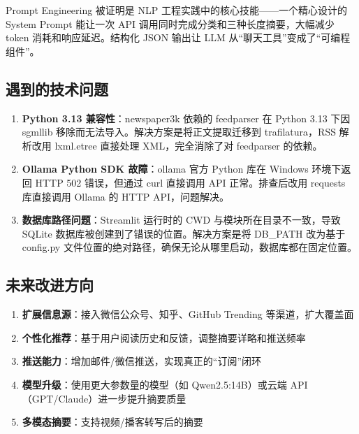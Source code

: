\documentclass[12pt,a4paper]{ctexart}
\begin{document}
Prompt Engineering 被证明是 NLP 工程实践中的核心技能——一个精心设计的 System Prompt 能让一次 API 调用同时完成分类和三种长度摘要，大幅减少 token 消耗和响应延迟。结构化 JSON 输出让 LLM 从“聊天工具”变成了“可编程组件”。

\subsection{遇到的技术问题}

\begin{enumerate}[label=(\arabic*),nosep]
    \item \textbf{Python 3.13 兼容性}：newspaper3k 依赖的 feedparser 在 Python 3.13 下因 sgmllib 移除而无法导入。解决方案是将正文提取迁移到 trafilatura，RSS 解析改用 lxml.etree 直接处理 XML，完全消除了对 feedparser 的依赖。
    \item \textbf{Ollama Python SDK 故障}：ollama 官方 Python 库在 Windows 环境下返回 HTTP 502 错误，但通过 curl 直接调用 API 正常。排查后改用 requests 库直接调用 Ollama 的 HTTP API，问题解决。
    \item \textbf{数据库路径问题}：Streamlit 运行时的 CWD 与模块所在目录不一致，导致 SQLite 数据库被创建到了错误的位置。解决方案是将 DB\_PATH 改为基于 config.py 文件位置的绝对路径，确保无论从哪里启动，数据库都在固定位置。
\end{enumerate}

\subsection{未来改进方向}

\begin{enumerate}[label=(\arabic*),nosep]
    \item \textbf{扩展信息源}：接入微信公众号、知乎、GitHub Trending 等渠道，扩大覆盖面
    \item \textbf{个性化推荐}：基于用户阅读历史和反馈，调整摘要详略和推送频率
    \item \textbf{推送能力}：增加邮件/微信推送，实现真正的“订阅”闭环
    \item \textbf{模型升级}：使用更大参数量的模型（如 Qwen2.5:14B）或云端 API（GPT/Claude）进一步提升摘要质量
    \item \textbf{多模态摘要}：支持视频/播客转写后的摘要
\end{enumerate}
\end{document}
